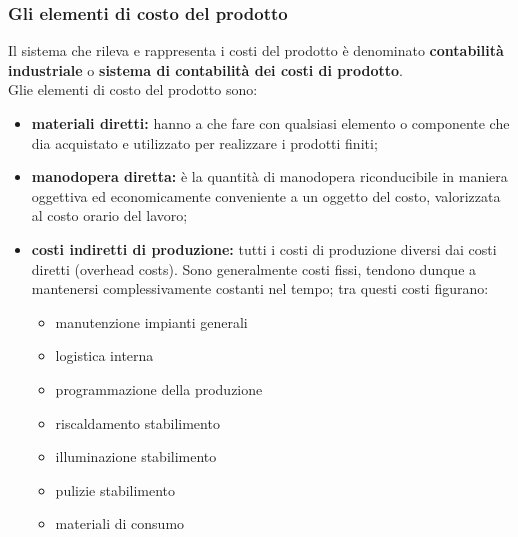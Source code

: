 \documentclass{article}
\begin{document}
\subsubsection{Gli elementi di costo del prodotto}
Il sistema che rileva e rappresenta i costi del prodotto è denominato \textbf{contabilità industriale} o \textbf{sistema di contabilità dei costi di prodotto}.
\vspace*{0.2cm}\\
Glie elementi di costo del prodotto sono:
\begin{itemize}
    \item \textbf{materiali diretti:} hanno a che fare con qualsiasi elemento o componente  che dia acquistato e utilizzato per realizzare i prodotti finiti;
    \item \textbf{manodopera diretta:} è la quantità di manodopera riconducibile in maniera oggettiva ed economicamente conveniente a un oggetto del costo, valorizzata al costo orario del lavoro;
    \item \textbf{costi indiretti di produzione:} tutti i costi di produzione diversi dai costi diretti (overhead costs). Sono generalmente costi fissi, tendono dunque a mantenersi complessivamente costanti nel tempo; tra questi costi figurano:
    \begin{itemize}
        \item manutenzione impianti generali
        \item logistica interna
        \item programmazione della produzione
        \item riscaldamento stabilimento
        \item illuminazione stabilimento
        \item pulizie stabilimento
        \item materiali di consumo
    \end{itemize}
\end{itemize}
\end{document}
